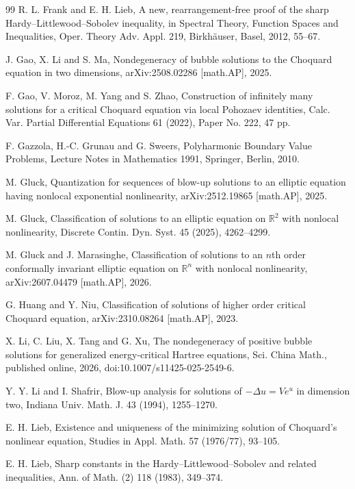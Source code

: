 \documentclass[11pt]{article}
\numberwithin{equation}{section}
\begin{document}
\begin{thebibliography}{99}
R. L. Frank and E. H. Lieb,
A new, rearrangement-free proof of the sharp Hardy--Littlewood--Sobolev inequality,
in Spectral Theory, Function Spaces and Inequalities, Oper. Theory Adv. Appl. 219,
Birkh\"auser, Basel, 2012, 55--67.

J. Gao, X. Li and S. Ma,
Nondegeneracy of bubble solutions to the Choquard equation in two dimensions,
arXiv:2508.02286 [math.AP], 2025.

F. Gao, V. Moroz, M. Yang and S. Zhao,
Construction of infinitely many solutions for a critical Choquard equation via local Pohozaev identities,
Calc. Var. Partial Differential Equations 61 (2022), Paper No. 222, 47 pp.

F. Gazzola, H.-C. Grunau and G. Sweers,
Polyharmonic Boundary Value Problems,
Lecture Notes in Mathematics 1991, Springer, Berlin, 2010.

M. Gluck,
Quantization for sequences of blow-up solutions to an elliptic equation having nonlocal exponential nonlinearity,
arXiv:2512.19865 [math.AP], 2025.

M. Gluck,
Classification of solutions to an elliptic equation on \(\mathbb R^{2}\) with nonlocal nonlinearity,
Discrete Contin. Dyn. Syst. 45 (2025), 4262--4299.

M. Gluck and J. Marasinghe,
Classification of solutions to an \(n\)th order conformally invariant elliptic equation on \(\mathbb R^{n}\) with nonlocal nonlinearity,
arXiv:2607.04479 [math.AP], 2026.

G. Huang and Y. Niu,
Classification of solutions of higher order critical Choquard equation,
arXiv:2310.08264 [math.AP], 2023.

X. Li, C. Liu, X. Tang and G. Xu,
The nondegeneracy of positive bubble solutions for generalized energy-critical Hartree equations,
Sci. China Math., published online, 2026,
doi:10.1007/s11425-025-2549-6.

Y. Y. Li and I. Shafrir,
Blow-up analysis for solutions of \(-\Delta u=Ve^{u}\) in dimension two,
Indiana Univ. Math. J. 43 (1994), 1255--1270.

E. H. Lieb,
Existence and uniqueness of the minimizing solution of Choquard's nonlinear equation,
Studies in Appl. Math. 57 (1976/77), 93--105.

E. H. Lieb,
Sharp constants in the Hardy--Littlewood--Sobolev and related inequalities,
Ann. of Math. (2) 118 (1983), 349--374.


\end{thebibliography}
\end{document}

